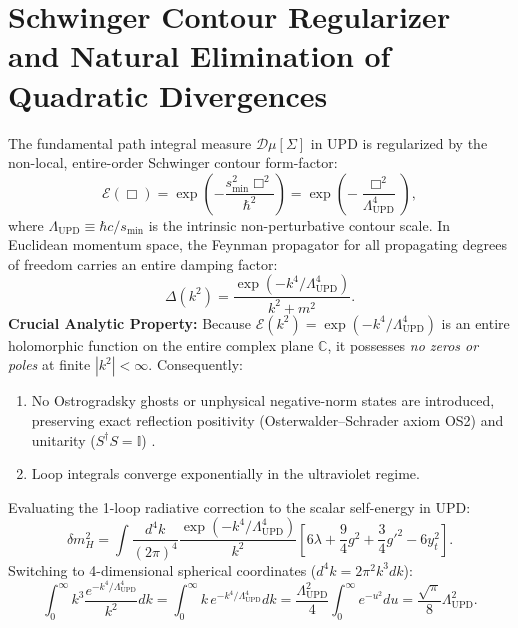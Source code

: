 \documentclass[11pt,a4paper]{article}
\begin{document}
\section{Schwinger Contour Regularizer and Natural Elimination of Quadratic Divergences}
The fundamental path integral measure $\mathcal{D}\mu[\Sigma]$ in UPD is regularized by the non-local, entire-order Schwinger contour form-factor:
\begin{equation}
\mathcal{E}(\Box) = \exp \left( -\frac{s_{\mathrm{min}}^2 \Box^2}{\hbar^2} \right) = \exp \left( -\frac{\Box^2}{\Lambda_{\mathrm{UPD}}^4} \right),
\label{eq:Schwinger_form_factor}
\end{equation}
where $\Lambda_{\mathrm{UPD}} \equiv \hbar c / s_{\mathrm{min}}$ is the intrinsic non-perturbative contour scale.
In Euclidean momentum space, the Feynman propagator for all propagating degrees of freedom carries an entire damping factor:
\begin{equation}
\Delta(k^2) = \frac{\exp(-k^4 / \Lambda_{\mathrm{UPD}}^4)}{k^2 + m^2}.
\label{eq:propagator_damped}
\end{equation}
\textbf{Crucial Analytic Property:} Because $\mathcal{E}(k^2) = \exp(-k^4 / \Lambda_{\mathrm{UPD}}^4)$ is an entire holomorphic function on the entire complex plane $\mathbb{C}$, it possesses \textit{no zeros or poles} at finite $|k^2| < \infty$. Consequently:
\begin{enumerate}
    \item No Ostrogradsky ghosts or unphysical negative-norm states are introduced, preserving exact reflection positivity (Osterwalder--Schrader axiom OS2) and unitarity ($S^\dagger S = \mathbb{I}$) \cite{PavliukZenodo8}.
    \item Loop integrals converge exponentially in the ultraviolet regime.
\end{enumerate}
Evaluating the 1-loop radiative correction to the scalar self-energy in UPD:
\begin{equation}
\delta m_H^2 = \int \frac{d^4 k}{(2\pi)^4} \frac{\exp(-k^4 / \Lambda_{\mathrm{UPD}}^4)}{k^2} \left[ 6 \lambda + \frac{9}{4} g^2 + \frac{3}{4} g'^2 - 6 y_t^2 \right].
\label{eq:UPD_loop_integral}
\end{equation}
Switching to 4-dimensional spherical coordinates ($d^4 k = 2\pi^2 k^3 dk$):
\begin{equation}
\int_0^\infty k^3 \frac{e^{-k^4/\Lambda_{\mathrm{UPD}}^4}}{k^2} dk = \int_0^\infty k\, e^{-k^4/\Lambda_{\mathrm{UPD}}^4} dk = \frac{\Lambda_{\mathrm{UPD}}^2}{4} \int_0^\infty e^{-u^2} du = \frac{\sqrt{\pi}}{8} \Lambda_{\mathrm{UPD}}^2.
\end{equation}
\end{document}
